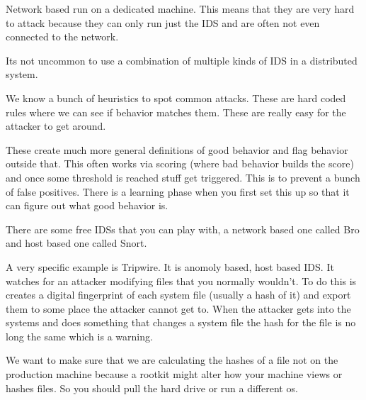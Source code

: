 \documentclass{article}
\begin{document}
Network based run on a dedicated machine. This means that they are very hard to attack because they can only run just the IDS and are often not even connected to the network.  

Its not uncommon to use a combination of multiple kinds of IDS in a distributed system.


We know a bunch of heuristics to spot common attacks. These are hard coded rules where we can see if behavior matches them. These are really easy for the attacker to get around. 


These create much more general definitions of good behavior and flag behavior outside that. This often works via scoring (where bad behavior builds the score) and once some threshold is reached stuff get triggered. This is to prevent a bunch of false positives. There is a learning phase when you first set this up so that it can figure out what good behavior is. 


There are some free IDSs that you can play with, a network based one called Bro and host based one called Snort.

A very specific example is Tripwire. It is anomoly based, host based IDS. It watches for an attacker modifying files that you normally wouldn't. To do this is creates a digital fingerprint of each system file (usually a hash of it) and export them to some place the attacker cannot get to. When the attacker gets into the systems and does something that changes a system file the hash for the file is no long the same which is a warning.

We want to make sure that we are calculating the hashes of a file not on the production machine because a rootkit might alter how your machine views or hashes files. So you should pull the hard drive or run a different os.


\end{document}
